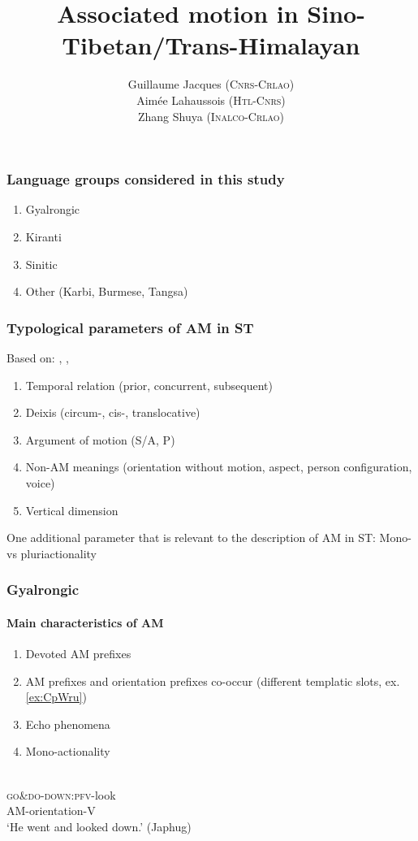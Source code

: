 \documentclass[xcolor=table]{beamer}
\newcommand{\bleu}[1]{{\color{blue}#1}}
\newcommand{\rouge}[1]{{\color{red}#1}}
\newcommand{\ipa}[1]{{\phon\textit{#1}}}
\begin{document}
 \title{Associated motion in Sino-Tibetan/Trans-Himalayan}
 \author{Guillaume Jacques (\textsc{Cnrs-Crlao})\\ Aimée Lahaussois (\textsc{Htl-Cnrs}) \\ Zhang Shuya (\textsc{Inalco-Crlao})}
 \date{}
 \maketitle
  
 \begin{frame} 
\frametitle{Language groups considered in this study }
\begin{enumerate}
\item Gyalrongic
\item Kiranti
\item Sinitic
\item Other (Karbi, Burmese, Tangsa)
\end{enumerate}
 \end{frame}  
  
\begin{frame} 
\frametitle{Typological parameters of AM in ST}
Based on: \citealt{koch84associated.motion}, \citealt{wilkins91associated.motion}, \citealt{guillaume16am}
\begin{enumerate}
\item Temporal relation (prior, concurrent, subsequent)
\item Deixis (circum-, cis-, translocative)
\item Argument of motion (S/A, P)
\item Non-AM meanings (orientation without motion, aspect, person configuration, voice)
\item Vertical dimension
\end{enumerate}
One additional parameter that is relevant to the description of AM in ST:  \bleu{Mono- vs pluriactionality}
 \end{frame}  

\begin{frame} 
\frametitle{Gyalrongic}
 \framesubtitle{Main characteristics of AM}
\begin{enumerate}
\item Devoted AM prefixes
\item AM prefixes and orientation prefixes co-occur (different templatic slots, ex. \ref{ex:CpWru})
\item Echo phenomena
\item Mono-actionality
\end{enumerate}

\begin{exe}
\ex \label{ex:CpWru}
\glll \ipa{\rouge{ɕ}-\bleu{pɯ}-ru} \\
 \rouge{\textsc{go\&do}}-\bleu{\textsc{down}:\textsc{pfv}}-look \\
\rouge{AM}-\bleu{orientation}-V \\
\glt `He \rouge{went and} looked \bleu{down}.' (Japhug)
\end{exe}

 \end{frame}  
 
\end{document}
